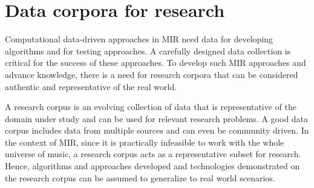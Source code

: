 \chapter{Data corpora for research}\label{chap:datasets}
\begin{epigraphs}
\end{epigraphs}
%
\noindent Computational data-driven approaches in \gls{MIR} need data for developing algorithms and for testing approaches. A carefully designed data collection is critical for the success of these approaches. To develop such \gls{MIR} approaches and advance knowledge, there is a need for research corpora that can be considered authentic and representative of the real world. 

A research corpus is an evolving collection of data that is representative of the domain under study and can be used for relevant research problems. A good data corpus includes data from multiple sources and can even be community driven. In the context of \gls{MIR}, since it is practically infeasible to work with the whole universe of music, a research corpus acts as a representative subset for research. Hence, algorithms and approaches developed and technologies demonstrated on the research corpus can be assumed to generalize to real world scenarios.

